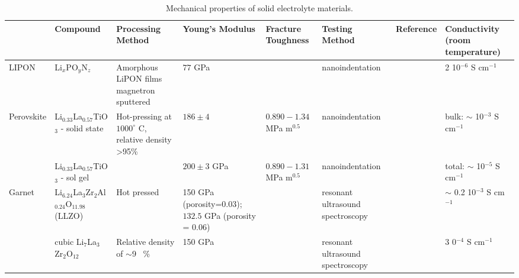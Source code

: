 \documentclass[final,5p,sort&compress]{elsarticle}
\begin{document}
\begin{table*}[]
\centering
\caption{Mechanical properties of solid electrolyte materials.}
\label{tab:SEmechanicalProp}
\begin{adjustbox}{width=1\textwidth}
\begin{tabular}{ l  L{3.5cm}  L{3cm}  L{3cm}  L{2cm}  L{3cm}  L{1.5cm}  L{3cm} }
\hline
& Compound	&	Processing Method	& Young's Modulus 	 & Fracture Toughness 	& Testing Method 	& Reference  & Conductivity  \newline (room temperature)   \\
\hline
%
LIPON  & 
Li$_x$PO$_y$N$_z$  & 
{\small{Amorphous LiPON films magnetron sputtered}} & 
$77$ GPa  & 
& 
nanoindentation    & 
\cite{Herbert2011} & 
2 10$^{-6}$ S cm$^{-1}$  \\
\midrule
Perovskite & 
Li$_{0.33}$La$_{0.57}$TiO$_3$ - solid state  & 
{\small{Hot-pressing at $1000^{\circ}$ C, \newline
relative density \textgreater 95\%}} & 
$186 \pm 4 $ & 
$0.890 - 1.34$ MPa m$^{0.5}$ & 
nanoindentation    & 
\cite{Cho2012} & 
bulk: $\sim$ 10$^{-3}$ S cm$^{-1}$ \\
 & 
Li$_{0.33}$La$_{0.57}$TiO$_3$ - sol gel&   
 & 
$200 \pm 3$ GPa      & 
$0.890 - 1.31$ MPa m$^{0.5}$ &                                                      nanoindentation&    
&  
total: $\sim$ 10$^{-5}$ S cm$^{-1}$   \\
\midrule
Garnet & 
Li$_{6.24}$La$_3$Zr$_2$Al$_{0.24}$O$_{11.98}$ (LLZO)  & 
{\small{Hot pressed}}  & 
150 GPa (porosity=0.03);     $132.5$ GPa \newline (porosity = 0.06)&  
& 
resonant ultrasound spectroscopy    & 
\cite{Ni2012} & 
$\sim$ 0.2 10$^{-3}$ S cm$^{-1}$ \\
%
& 
cubic Li$_7$La$_3$Zr$_2$O$_{12}$               
& {\small{Relative density of $\sim$9~ \%}} & 
150 GPa &                       
& 
resonant ultrasound spectroscopy  & 
& 
3 0$^{-4}$ S cm$^{-1}$ \\
\midrule

\end{tabular}
\end{adjustbox}
\end{table*}
\end{document}
